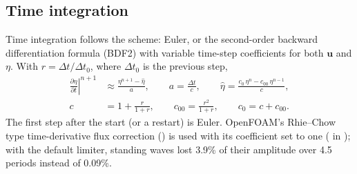 \subsection{Time integration}
\label{sec:time}

Time integration follows the  scheme: Euler, or the second-order
backward differentiation formula (BDF2) with variable time-step coefficients
for both $\bm{u}$ and $\eta$. With $r = \Delta t/\Delta t_0$, where $\Delta t_0$ is
the previous step,
\begin{equation}
  \begin{aligned}
  \left.\frac{\partial\eta}{\partial t}\right|^{n+1} &\approx \frac{\eta^{n+1}-\hat\eta}{a},\qquad
  a = \frac{\Delta t}{c},\qquad
  \hat\eta = \frac{c_0\,\eta^{n} - c_{00}\,\eta^{n-1}}{c},\\
  c &= 1 + \frac{r}{1+r},\qquad
  c_{00} = \frac{r^2}{1+r},\qquad
  c_0 = c + c_{00}.
  \end{aligned}
  \label{eq:bdf2}
\end{equation}
The first step after the start (or a restart) is Euler. OpenFOAM's Rhie--Chow
type time-derivative flux correction () is used with its
coefficient set to one ( in ); with the
default limiter, standing waves lost 3.9\% of their amplitude over 4.5
periods instead of 0.09\%.

